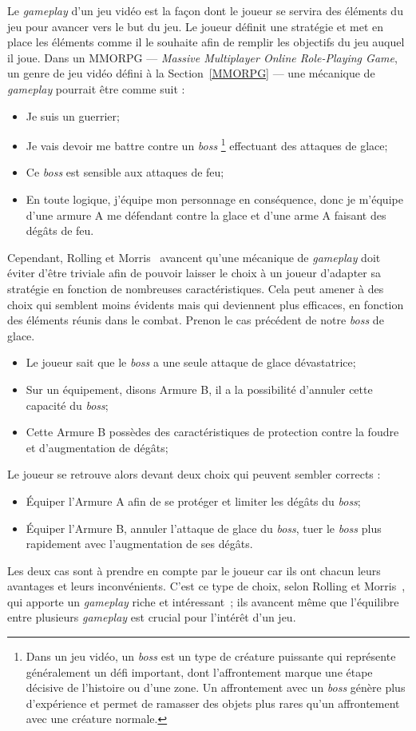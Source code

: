 Le \emph{gameplay} d'un jeu vidéo est la façon dont le joueur se servira des éléments du jeu pour avancer vers le but du jeu.
Le joueur définit une stratégie et met en place les éléments comme il le souhaite afin de remplir les objectifs du jeu auquel il joue.
Dans un MMORPG --- \emph{Massive Multiplayer Online Role-Playing Game}, un genre de jeu vidéo défini \`a la Section~\ref{MMORPG} --- une mécanique de \emph{gameplay} pourrait \^etre comme suit :
\begin{itemize}
    \item Je suis un guerrier;
    \item Je vais devoir me battre contre un \emph{boss}%
%
\footnote{Dans un jeu vid\'eo, un \emph{boss} est un type de créature puissante qui représente généralement un défi important, dont l'affrontement marque une étape décisive de l'histoire ou d'une zone. Un affrontement avec un \emph{boss} génère plus d'expérience et permet de ramasser des objets plus rares qu'un affrontement avec une créature normale.}
% 
      effectuant des attaques de glace;
    \item Ce \emph{boss} est sensible aux attaques de feu;
    \item En toute logique, j'équipe mon personnage en conséquence, donc 
     je m'équipe d'une armure A me défendant contre la glace et d'une arme A faisant des dégâts de feu.
\end{itemize}
Cependant, Rolling et Morris~\cite{Rollings2004} avancent qu'une mécanique de \emph{gameplay} doit éviter d'être triviale afin de pouvoir laisser le choix à un joueur d'adapter sa stratégie en fonction de nombreuses caractéristiques.
Cela peut amener à des choix qui semblent moins évidents mais qui deviennent plus efficaces, en fonction des éléments réunis dans le combat.
Prenon le cas précédent de notre \emph{boss} de glace.
\begin{itemize}
    \item Le joueur sait que le \emph{boss} a une seule attaque de glace dévastatrice;
    \item Sur un équipement, disons Armure B, il a la possibilité d'annuler cette capacité du \emph{boss};
    \item Cette Armure B possèdes des caract\'eristiques de protection contre la foudre et d'augmentation de dégâts;
\end{itemize}
Le joueur se retrouve alors devant deux choix qui peuvent sembler corrects :
\begin{itemize}
    \item Équiper l'Armure A afin de se protéger et limiter les dégâts du \emph{boss};
    \item Équiper l'Armure B, annuler l'attaque de glace du \emph{boss}, tuer le \emph{boss} plus rapidement avec l'augmentation de ses dégâts. 
\end{itemize}
Les deux cas sont à prendre en compte par le joueur car ils ont chacun leurs avantages et leurs inconvénients.
C'est ce type de choix, selon Rolling et Morris~\cite{Rollings2004}, qui apporte un \emph{gameplay} riche et intéressant~;  
ils avancent même que l'équilibre entre plusieurs \emph{gameplay} est crucial pour l'int\'er\^et d'un jeu.

